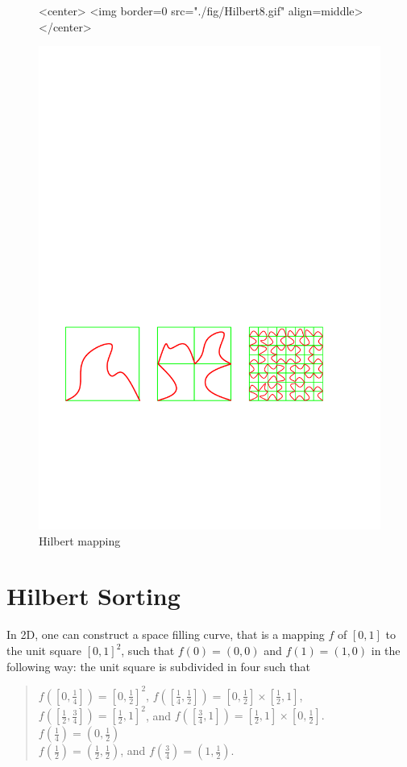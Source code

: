 \begin{figure}
\begin{ccHtmlOnly}
<center>
<img border=0 src="./fig/Hilbert8.gif" align=middle>
</center>
\end{ccHtmlOnly} 
\begin{ccTexOnly}
\begin{center}
\includegraphics[width=11.5cm]{Spatial_sorting/fig/Hilbert8}
\end{center}
\end{ccTexOnly}
\caption{Hilbert mapping
\label{Spatial_sorting_fig_Hilbert8}}
\end{figure}

\section{Hilbert Sorting\label{sec:hilbert_sorting}}


In 2D, one can construct a space filling curve, that is a mapping $f$ of $[0,1]$
to the unit square $[0,1]^2$, such that $f(0)=(0,0)$ and $f(1)=(1,0)$ 
 in the following way:
the unit square is subdivided in four such that\\
\begin{quote}
$f([0,\frac{1}{4}])=[0,\frac{1}{2}]^2$, 
$f([\frac{1}{4},\frac{1}{2}])=[0,\frac{1}{2}]\times[\frac{1}{2},1]$,
$f([\frac{1}{2},\frac{3}{4}])=[\frac{1}{2},1]^2$,
and 
$f([\frac{3}{4},1])=[\frac{1}{2},1]\times[0,\frac{1}{2}].$\\
$f(\frac{1}{4})=(0,\frac{1}{2})$\\
$f(\frac{1}{2})=(\frac{1}{2},\frac{1}{2})$, and
$f(\frac{3}{4})=(1,\frac{1}{2})$.
\end{quote}


